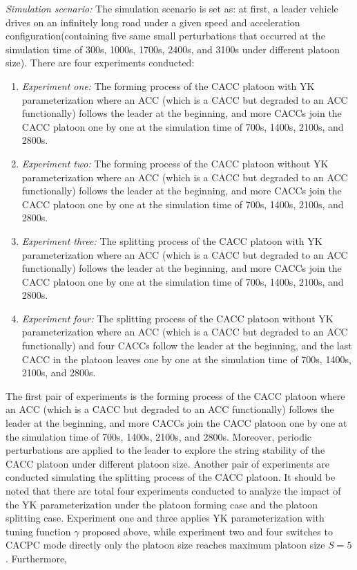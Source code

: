 \documentclass[a4paper,fleqn]{cas-sc}
\begin{document}
\textit{Simulation scenario:} The simulation scenario is set as: at first, a leader vehicle drives on an infinitely long road under a given speed and acceleration configuration(containing five same small perturbations that occurred at the simulation time of 300s, 1000s, 1700s, 2400s, and 3100s under different platoon size). There are four experiments conducted:
\begin{enumerate}
  \item \textit{Experiment one:} The forming process of the CACC platoon with YK parameterization where an ACC (which is a CACC but degraded to an ACC functionally) follows the leader at the beginning, and more CACCs join the CACC platoon one by one at the simulation time of 700s, 1400s, 2100s, and 2800s.
  \item \textit{Experiment two:} The forming process of the CACC platoon without YK parameterization where an ACC (which is a CACC but degraded to an ACC functionally) follows the leader at the beginning, and more CACCs join the CACC platoon one by one at the simulation time of 700s, 1400s, 2100s, and 2800s.
  \item \textit{Experiment three:} The splitting process of the CACC platoon with YK parameterization where an ACC (which is a CACC but degraded to an ACC functionally) follows the leader at the beginning, and more CACCs join the CACC platoon one by one at the simulation time of 700s, 1400s, 2100s, and 2800s.
  \item \textit{Experiment four:} The splitting process of the CACC platoon without YK parameterization where an ACC (which is a CACC but degraded to an ACC functionally) and four CACCs follow the leader at the beginning, and the last CACC in the platoon leaves one by one at the simulation time of 700s, 1400s, 2100s, and 2800s.
\end{enumerate}
The first pair of experiments is the forming process of the CACC platoon where an ACC (which is a CACC but degraded to an ACC functionally) follows the leader at the beginning, and more CACCs join the CACC platoon one by one at the simulation time of 700s, 1400s, 2100s, and 2800s. Moreover, periodic perturbations are applied to the leader to explore the string stability of the CACC platoon under different platoon size. Another pair of experiments are conducted simulating the splitting process of the CACC platoon. It should be noted that there are total four experiments conducted to analyze the impact of the YK parameterization under the platoon forming case and the platoon splitting case. Experiment one and three applies YK parameterization with tuning function $\gamma$ proposed above, while experiment two and four switches to CACPC mode directly only the platoon size reaches maximum platoon size $S=5$. Furthermore,
\end{document}
